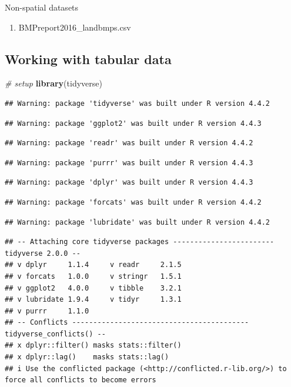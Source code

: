 \documentclass[
]{article}
\newenvironment{Shaded}{\begin{snugshade}}{\end{snugshade}}
\newcommand{\CommentTok}[1]{\textcolor[rgb]{0.56,0.35,0.01}{\textit{#1}}}
\newcommand{\FunctionTok}[1]{\textcolor[rgb]{0.13,0.29,0.53}{\textbf{#1}}}
\newcommand{\NormalTok}[1]{#1}
\providecommand{\tightlist}{%
  \setlength{\itemsep}{0pt}\setlength{\parskip}{0pt}}
\begin{document}
Non-spatial datasets

\begin{enumerate}
\def\labelenumi{\arabic{enumi}.}
\tightlist
\item
  BMPreport2016\_landbmps.csv
\end{enumerate}

\subsection{Working with tabular data}\label{working-with-tabular-data}

\begin{Shaded}
\begin{Highlighting}[]
\CommentTok{\# setup}
\FunctionTok{library}\NormalTok{(tidyverse)}
\end{Highlighting}
\end{Shaded}

\begin{verbatim}
## Warning: package 'tidyverse' was built under R version 4.4.2
\end{verbatim}

\begin{verbatim}
## Warning: package 'ggplot2' was built under R version 4.4.3
\end{verbatim}

\begin{verbatim}
## Warning: package 'readr' was built under R version 4.4.2
\end{verbatim}

\begin{verbatim}
## Warning: package 'purrr' was built under R version 4.4.3
\end{verbatim}

\begin{verbatim}
## Warning: package 'dplyr' was built under R version 4.4.3
\end{verbatim}

\begin{verbatim}
## Warning: package 'forcats' was built under R version 4.4.2
\end{verbatim}

\begin{verbatim}
## Warning: package 'lubridate' was built under R version 4.4.2
\end{verbatim}

\begin{verbatim}
## -- Attaching core tidyverse packages ------------------------ tidyverse 2.0.0 --
## v dplyr     1.1.4     v readr     2.1.5
## v forcats   1.0.0     v stringr   1.5.1
## v ggplot2   4.0.0     v tibble    3.2.1
## v lubridate 1.9.4     v tidyr     1.3.1
## v purrr     1.1.0     
## -- Conflicts ------------------------------------------ tidyverse_conflicts() --
## x dplyr::filter() masks stats::filter()
## x dplyr::lag()    masks stats::lag()
## i Use the conflicted package (<http://conflicted.r-lib.org/>) to force all conflicts to become errors
\end{verbatim}
\end{document}
